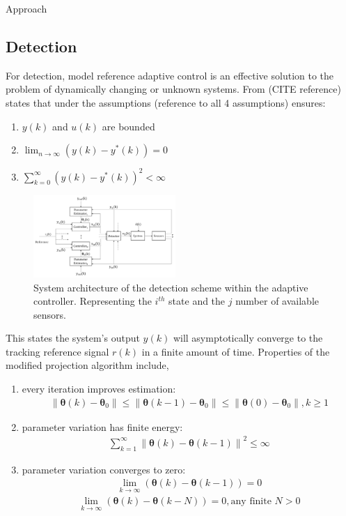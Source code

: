 \begin{section}{Approach}
\subsection{Detection}

For detection, model reference adaptive control is an effective solution to the problem of dynamically changing or unknown systems. From (CITE reference) states that under the assumptions (reference to all 4 assumptions) ensures:
	\begin{enumerate}[label=(\roman*),leftmargin=4\parindent]
	\item $y(k)$ and $u(k)$ are bounded 
	\item $\lim_{n\to\infty}(y(k)-y^*(k))=0$
	\item $\sum_{k=0}^\infty(y(k)-y^*(k))^2<\infty$
	\end{enumerate}
	
	\begin{figure}[ht!]
\vspace{1pt}
\centering
\includegraphics[width=0.48\textwidth]{con_and_det.png}
\caption{System architecture of the detection scheme within the adaptive controller. Representing the $i^{th}$ state and the $j$ number of available sensors.}
\label{fig:det_arch}
\end{figure}

This states the system's output $y(k)$ will asymptotically converge to the tracking reference signal $r(k)$ in a finite amount of time. Properties of the modified projection algorithm include,
    \begin{enumerate}[label=(\roman*),leftmargin=3\parindent]
	\item every iteration improves estimation:
	    \begin{align}
	        \|\bm{\theta}(k)-\bm{\theta}_0\|\leq\|\bm{\theta}(k-1)-\bm{\theta}_0\|\leq\|\bm{\theta}(0)-\bm{\theta}_0\|, k\geq1 \nonumber
	    \end{align}
	\item parameter variation has finite energy:
	    \begin{align}
	        \sum_{k=1}^\infty{\|\bm{\theta}(k)-\bm{\theta}(k-1)\|}^2\leq \infty \nonumber
	    \end{align}
	\item parameter variation converges to zero:
	    \begin{align}
	        \lim_{k\to\infty}(\bm{\theta}(k)-\bm{\theta}(k-1))=0 \nonumber
	    \end{align}
	    \begin{align}
	        \lim_{k\to\infty}(\bm{\theta}(k)-\bm{\theta}(k-N))=0, \text{any finite } N>0 \nonumber
	    \end{align}
	\end{enumerate}


\end{section}
